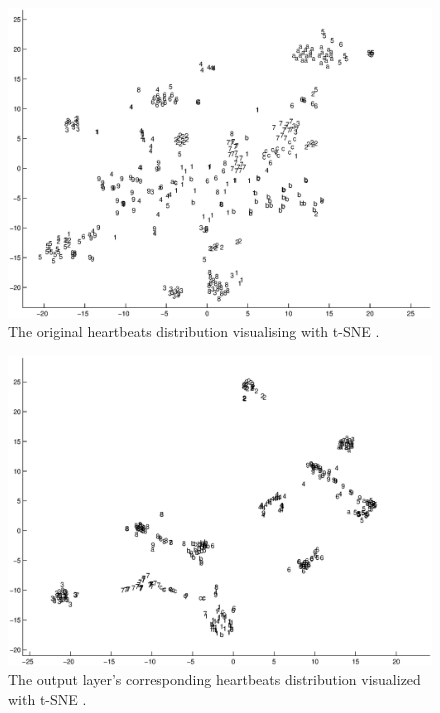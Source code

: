 \documentclass[conference]{IEEEtran}
\begin{document}
\begin{figure}[t]
\centering
\includegraphics[width=7.2in]{distr.eps}
\caption{The original heartbeats distribution visualising with t-SNE \cite{Van}.}
\label{figure4}
\end{figure}

\begin{figure}[t]
\centering
\includegraphics[width=7.2in]{mapdistr.eps}
\caption{The output layer's corresponding heartbeats distribution visualized with t-SNE \cite{Van}.}
\label{figure5}
\end{figure}
\end{document}

